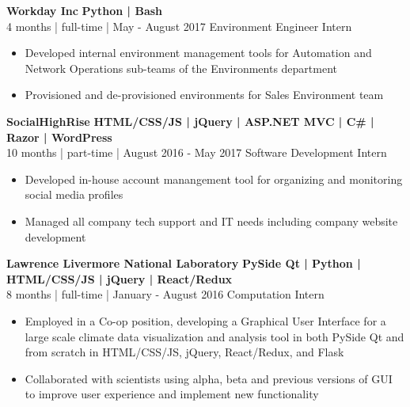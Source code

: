 \documentclass[12pt]{article}
\begin{document}
    \begin{footnotesize}
    \flushleft
    \textbf{\color{primary}\large Workday Inc} \hfill \textbf{\color{Cerulean}Python | Bash}\\ 
    {\color{primary}4 months | full-time | May - August 2017} \hfill {\color{Cerulean} Environment Engineer Intern}
    \vspace{-2mm}
    \begin{itemize}
        \setlength{\itemsep}{0pt}
        \item Developed internal environment management tools for Automation and Network Operations sub-teams of the Environments department
        \item Provisioned and de-provisioned environments for Sales Environment team
    \end{itemize}
    \textbf{\color{primary}\large SocialHighRise} \hfill  \textbf{\color{Cerulean}HTML/CSS/JS | jQuery | ASP.NET MVC | C\# | Razor | WordPress } \\ 
    {\color{primary}10 months | part-time | August 2016 - May 2017} \hfill {\color{Cerulean} Software Development Intern}
    \vspace{-2mm}
    \begin{itemize}
        \setlength{\itemsep}{0pt}
        \item Developed in-house account manangement tool for organizing and monitoring social media profiles
        \item Managed all company tech support and IT needs including company website development
    \end{itemize}
    \textbf{\color{primary}\large Lawrence Livermore National Laboratory} \hfill \textbf{\color{Cerulean}PySide Qt | Python | HTML/CSS/JS | jQuery | React/Redux}\\
    {\color{primary}8 months | full-time | January - August 2016} \hfill {\color{Cerulean} Computation Intern}
    \vspace{-2mm}
    \begin{itemize}
        \setlength{\itemsep}{0pt}
        \item Employed in a Co-op position, developing a Graphical User Interface for a large scale climate data visualization and analysis tool in both PySide Qt and from scratch in HTML/CSS/JS, jQuery, React/Redux, and Flask

        \item Collaborated with scientists using alpha, beta and previous versions of GUI to improve user experience and implement new functionality
    \end{itemize}

    \end{footnotesize}
    
\end{document}
